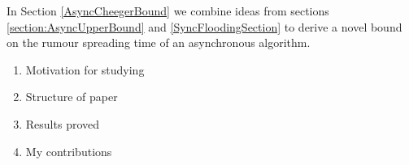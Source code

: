 In Section \ref{AsyncCheegerBound} we combine ideas from sections \ref{section:AsyncUpperBound} and \ref{SyncFloodingSection} to derive a novel bound on the rumour spreading time of an asynchronous algorithm. 


\begin{enumerate}
	\item Motivation for studying
	\item Structure of paper
	\item Results proved
	\item My contributions
\end{enumerate}